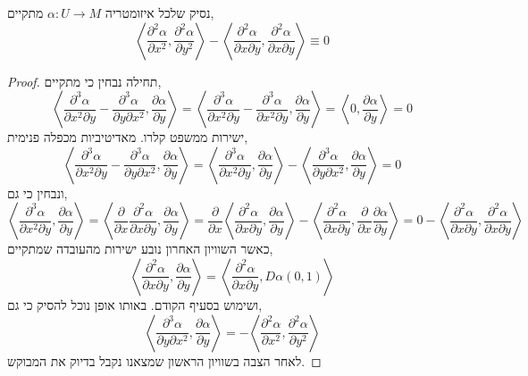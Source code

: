 \subquestion{}
נסיק שלכל איזומטריה $\alpha : U \to M$ מתקיים,
\[
	\left\langle \frac{\partial^2 \alpha}{\partial x^2}, \frac{\partial^2 \alpha}{\partial y^2} \right\rangle
	- \left\langle \frac{\partial^2 \alpha}{\partial x \partial y}, \frac{\partial^2 \alpha}{\partial x \partial y} \right\rangle
	\equiv 0
\]
\begin{proof}
	תחילה נבחין כי מתקיים,
	\[
		\left\langle \frac{\partial^3 \alpha}{\partial x^2 \partial y} - \frac{\partial^3 \alpha}{\partial y \partial x^2}, \frac{\partial \alpha}{\partial y} \right\rangle
		= \left\langle \frac{\partial^3 \alpha}{\partial x^2 \partial y} - \frac{\partial^3 \alpha}{\partial x^2 \partial y}, \frac{\partial \alpha}{\partial y} \right\rangle
		= \left\langle 0, \frac{\partial \alpha}{\partial y} \right\rangle
		= 0
	\]
	ישירות ממשפט קלרו.
	מאדיטיביות מכפלה פנימית,
	\[
		\left\langle \frac{\partial^3 \alpha}{\partial x^2 \partial y} - \frac{\partial^3 \alpha}{\partial y \partial x^2}, \frac{\partial \alpha}{\partial y} \right\rangle
		= \left\langle \frac{\partial^3 \alpha}{\partial x^2 \partial y}, \frac{\partial \alpha}{\partial y} \right\rangle
		- \left\langle\frac{\partial^3 \alpha}{\partial y \partial x^2}, \frac{\partial \alpha}{\partial y} \right\rangle
		= 0
	\]
	ונבחין כי גם,
	\[
		\left\langle \frac{\partial^3 \alpha}{\partial x^2 \partial y}, \frac{\partial \alpha}{\partial y} \right\rangle
		= \left\langle \frac{\partial}{\partial x} \frac{\partial^2 \alpha}{\partial x \partial y}, \frac{\partial \alpha}{\partial y} \right\rangle
		= \frac{\partial}{\partial x} \left\langle \frac{\partial^2 \alpha}{\partial x \partial y}, \frac{\partial \alpha}{\partial y} \right\rangle
		- \left\langle \frac{\partial^2 \alpha}{\partial x \partial y}, \frac{\partial}{\partial x} \frac{\partial \alpha}{\partial y} \right\rangle
		= 0 - \left\langle \frac{\partial^2 \alpha}{\partial x \partial y}, \frac{\partial^2 \alpha}{\partial x \partial y} \right\rangle
	\]
	כאשר השוויון האחרון נובע ישירות מהעובדה שמתקיים,
	\[
		\left\langle \frac{\partial^2 \alpha}{\partial x \partial y}, \frac{\partial \alpha}{\partial y} \right\rangle
		= \left\langle \frac{\partial^2 \alpha}{\partial x \partial y}, D \alpha(0, 1) \right\rangle
	\]
	ושימוש בסעיף הקודם.
	באותו אופן נוכל להסיק כי גם,
	\[
		\left\langle\frac{\partial^3 \alpha}{\partial y \partial x^2}, \frac{\partial \alpha}{\partial y} \right\rangle
		= - \left\langle\frac{\partial^2 \alpha}{\partial x^2}, \frac{\partial^2 \alpha}{\partial y^2} \right\rangle
	\]
	לאחר הצבה בשוויון הראשון שמצאנו נקבל בדיוק את המבוקש.
\end{proof}


